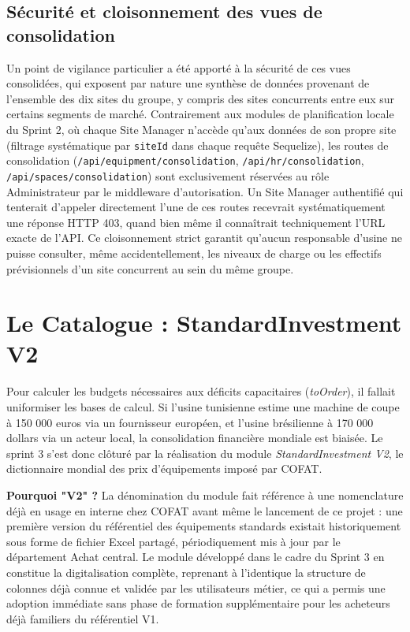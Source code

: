 \subsection{Sécurité et cloisonnement des vues de consolidation}
Un point de vigilance particulier a été apporté à la sécurité de ces vues consolidées, qui exposent par nature une synthèse de données provenant de l'ensemble des dix sites du groupe, y compris des sites concurrents entre eux sur certains segments de marché. Contrairement aux modules de planification locale du Sprint 2, où chaque Site Manager n'accède qu'aux données de son propre site (filtrage systématique par \texttt{siteId} dans chaque requête Sequelize), les routes de consolidation (\texttt{/api/equipment/consolidation}, \texttt{/api/hr/consolidation}, \texttt{/api/spaces/consolidation}) sont exclusivement réservées au rôle Administrateur par le middleware d'autorisation. Un Site Manager authentifié qui tenterait d'appeler directement l'une de ces routes recevrait systématiquement une réponse HTTP 403, quand bien même il connaîtrait techniquement l'URL exacte de l'API. Ce cloisonnement strict garantit qu'aucun responsable d'usine ne puisse consulter, même accidentellement, les niveaux de charge ou les effectifs prévisionnels d'un site concurrent au sein du même groupe.

\section{Le Catalogue : StandardInvestment V2}
Pour calculer les budgets nécessaires aux déficits capacitaires (\textit{toOrder}), il fallait uniformiser les bases de calcul. Si l'usine tunisienne estime une machine de coupe à 150 000 euros via un fournisseur européen, et l'usine brésilienne à 170 000 dollars via un acteur local, la consolidation financière mondiale est biaisée.
Le sprint 3 s'est donc clôturé par la réalisation du module \textit{StandardInvestment V2}, le dictionnaire mondial des prix d'équipements imposé par COFAT.

\textbf{Pourquoi "V2" ?} La dénomination du module fait référence à une nomenclature déjà en usage en interne chez COFAT avant même le lancement de ce projet : une première version du référentiel des équipements standards existait historiquement sous forme de fichier Excel partagé, périodiquement mis à jour par le département Achat central. Le module développé dans le cadre du Sprint 3 en constitue la digitalisation complète, reprenant à l'identique la structure de colonnes déjà connue et validée par les utilisateurs métier, ce qui a permis une adoption immédiate sans phase de formation supplémentaire pour les acheteurs déjà familiers du référentiel V1.

